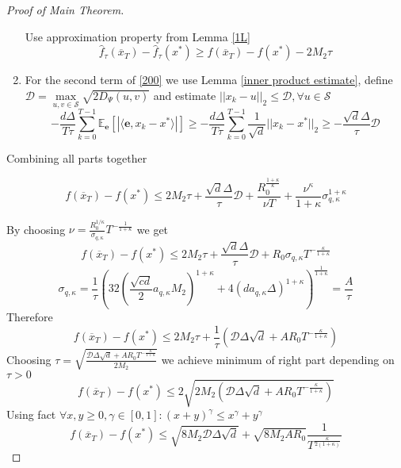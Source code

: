 \documentclass{article}
\theoremstyle{definition}
\theoremstyle{remark}
\def\EE{\mathbb{E}}
\begin{document}
\begin{proof}[Proof of Main Theorem]
\begin{enumerate}
Use approximation property from Lemma \ref{1L}
$$\hat{f}_\tau(\overline{x}_T) - \hat{f}_\tau(x^*) \geq f(\overline{x}_T) - f(x^*) - 2M_2\tau$$
\item For the second term of \ref{200} we use Lemma \ref{inner product estimate}, define $\mathcal{D} = \max \limits_{u,v \in \mathcal{S}} \sqrt{2D_\Psi(u,v)}$  and estimate $||x_k - u||_2 \leq \mathcal{D}, \forall u \in\mathcal{S}$
$$ - \frac{d \Delta}{T\tau} \sum \limits_{k=0}^{T-1}\EE_\mathbf{e} [|\langle \mathbf{e}, x_k  -x^* \rangle|] \geq -\frac{d\Delta}{T\tau}\sum \limits_{k=0}^{T-1} \frac{1}{\sqrt{d}} ||x_k - x^*||_2 \geq -\frac{\sqrt{d}\Delta}{\tau}\mathcal{D} $$
\end{enumerate}

Combining all parts together

$$f(\overline{x}_T) - f(x^*) \leq 2M_2\tau + \frac{\sqrt{d}\Delta}{\tau}\mathcal{D} + \frac{R_0^{\frac{1+\kappa}{\kappa}} }{\nu T} + \frac{\nu^{\kappa}}{1+\kappa}\sigma_{q,\kappa}^{1+\kappa}$$

By choosing $\nu = \frac{R_0^{1/\kappa}}{\sigma_{q,\kappa} }T^{-\frac{1}{1+\kappa}}$ we get
$$f(\overline{x}_T) - f(x^*) \leq 2M_2\tau + \frac{\sqrt{d}\Delta}{\tau}\mathcal{D} + R_0\sigma_{q,\kappa} T^{-\frac{\kappa}{1+\kappa}}$$
$$\sigma_{q,\kappa} = \frac{1}{\tau} \left(32\left(\frac{\sqrt{cd}}{2} a_{q,\kappa}M_2\right)^{1+\kappa} + 4\left(da_{q,\kappa}\Delta\right)^{1+\kappa}\right)^{\frac{1}{1+\kappa}}  = \frac{A}{\tau}$$
Therefore
$$f(\overline{x}_T) - f(x^*) \leq 2M_2\tau + \frac{1}{\tau}\left(\mathcal{D} \Delta \sqrt{d} + AR_0 T^{-\frac{\kappa}{1+\kappa}}\right)$$
Choosing $\tau = \sqrt{\frac{\mathcal{D} \Delta \sqrt{d} + AR_0 T^{-\frac{\kappa}{1+\kappa}}}{2M_2}}$ we achieve minimum of right part  depending on $\tau > 0$
$$f(\overline{x}_T) - f(x^*) \leq 2\sqrt{2M_2 \left(\mathcal{D} \Delta \sqrt{d} + AR_0 T^{-\frac{\kappa}{1+\kappa}} \right)}$$
Using fact $\forall x,y \geq 0, \gamma \in [0,1]: (x+y)^\gamma \leq x^\gamma + y^\gamma$
$$f(\overline{x}_T) - f(x^*) \leq \sqrt{8M_2 \mathcal{D} \Delta \sqrt{d}} + \sqrt{8M_2AR_0} \frac{1}{T^{\frac{\kappa}{2(1+\kappa)}}}$$ 

\end{proof}
\end{document}
